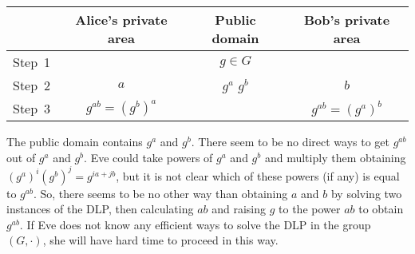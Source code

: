\documentclass{beamer}
\begin{document}
\begin{frame} 
\begin{tabular}{c||c|c|c}
	& Alice's private area & Public domain & Bob's private area \\ \hline  
	\hline 
	Step~1 & & $g \in G$ & \\ 
	Step~2 & $a$ & $g^a$ \qquad $g^b$ & $b$ \\
	Step~3 & $g^{ab} = (g^b)^a$ & & $g^{ab} = (g^a)^b$ \\
	\hline 
\end{tabular} 
\end{frame} 

\begin{frame} 
	The public domain contains $g^a$ and $g^b$. There seem to be no direct ways to get $g^{ab}$ out of $g^a$ and $g^b$. Eve could take powers of $g^a$ and $g^b$ and multiply them obtaining $(g^a)^i (g^b)^j = g^{i a + j b}$, but it is not clear which of these powers (if any) is equal to $g^{ab}$. So, there seems to be no other way than obtaining $a$ and $b$ by solving two instances of the DLP, then calculating $ab$ and raising $g$ to the power $ab$ to obtain $g^{ab}$. If Eve does not know any efficient ways to solve the DLP in the group $(G,\cdot)$, she will have hard time to proceed in this way. 
\end{frame} 
\end{document}
